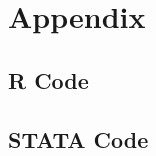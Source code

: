 \documentclass[11pt]{article}
\begin{document}



\section{Appendix}
\subsection{R Code}



\subsection{STATA Code}





\end{document}
